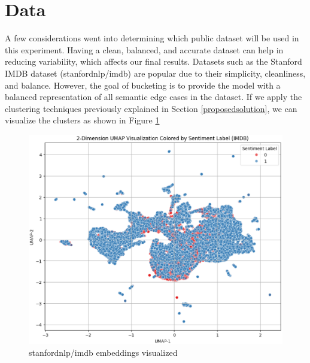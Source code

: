 \documentclass[twocolumn]{article}
\newcounter{ex}
\renewcommand{\indent}{\hspace*{2em}}
\begin{document}
\section{Data}\label{data}
\indent A few considerations went into determining which public dataset will be used in this experiment. Having a clean, balanced, and accurate dataset can help in reducing variability, which affects our final results. Datasets such as the Stanford IMDB dataset (stanfordnlp/imdb) \cite{maas-EtAl:2011:ACL-HLT2011} are popular due to their simplicity, cleanliness, and balance. However, the goal of bucketing is to provide the model with a balanced representation of all semantic edge cases in the dataset. If we apply the clustering techniques previously explained in Section \ref{proposedsolution}, we can visualize the clusters as shown in Figure \ref{fig:imdbembeddings}

\begin{table}[H]
  \begin{center}
    \caption{Clustering metrics for different UMAP reduction strategies. Arrows indicate whether higher (\(\uparrow\)) or lower (\(\downarrow\)) values are better.}
    \label{tab:umap_metrics_vertical}
  \end{center}
\end{table}


\begin{figure}[H]
    \centering
    \includegraphics[width=\linewidth]{imdb-embeddings.eps}
    \caption{stanfordnlp/imdb embeddings visualized}\label{fig:imdbembeddings}
\end{figure}
\end{document}

